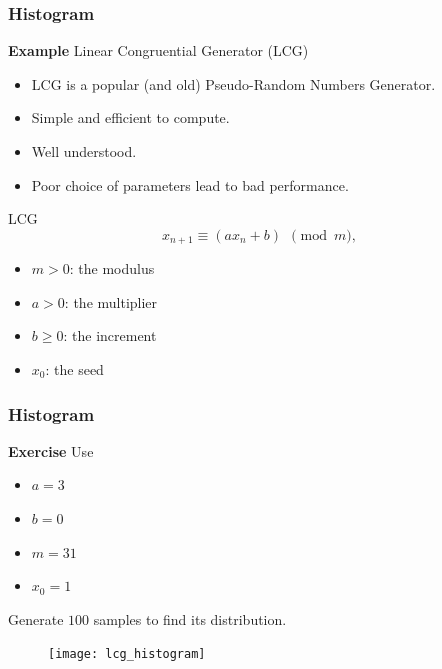 \documentclass{beamer}  %
\begin{document}
\begin{frame}[fragile]
\frametitle{Histogram}
\textbf{Example} 
Linear Congruential Generator (LCG)

\begin{itemize}[<+->]
    \item LCG is a popular (and old) Pseudo-Random Numbers Generator.
    \item Simple and efficient to compute.
    \item Well understood.
    \item Poor choice of parameters lead to bad performance.
\end{itemize}
\pause
\begin{block}{LCG}
\begin{equation}
    x_{n+1} \equiv \left( a x_n + b \right)~~\pmod{m},
\end{equation}
\begin{itemize}
    \item $m > 0$: the modulus
    \item $a > 0$: the multiplier
    \item $b \geq 0$: the increment
    \item $x_0$: the seed
\end{itemize}
\end{block}

\end{frame}
\begin{frame}[fragile]
\frametitle{Histogram}
\textbf{Exercise} 
Use
\begin{itemize}
    \item $a = 3$
    \item $b = 0$
    \item $m = 31$
    \item $x_0 = 1$
\end{itemize}
Generate $100$ samples to find its distribution.
\setcounter{subfigure}{0}
\begin{figure}
    \centering
   \texttt{[image: lcg\_histogram]}
\end{figure}

\end{frame}
\end{document}
